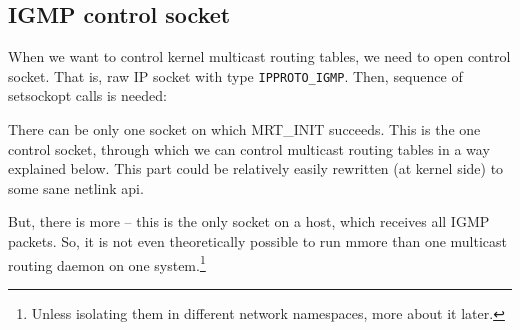 \subsection{IGMP control socket}

When we want to control kernel multicast routing tables, we need to open
control socket. That is, raw IP socket with type \texttt{IPPROTO\_IGMP}. Then,
sequence of setsockopt calls is needed:


There can be only one socket on which MRT\_INIT succeeds. This is the one
control socket, through which we can control multicast routing tables in a way
explained below. This part could be relatively easily rewritten (at kernel
side) to some sane netlink api.

But, there is more -- this is the only socket on a host, which receives all
IGMP packets. So, it is not even theoretically possible to run mmore than one
multicast routing daemon on one system.\footnote{Unless isolating them in
different network namespaces, more about it later.}
